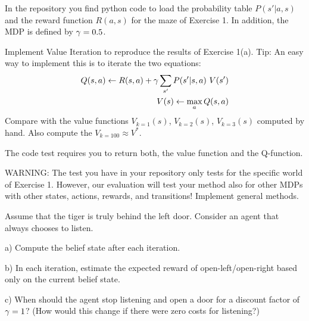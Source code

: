 

In the repository you find python code to load the probability table
$P(s'|a,s)$ and the reward function $R(a,s)$ for the maze of Exercise
1. In addition, the MDP is defined by $\gamma=0.5$.

Implement Value Iteration to reproduce the results of Exercise
1(a). Tip: An easy way to implement this is to iterate the two
equations:
\begin{align}
Q(s,a) \gets R(s,a) + \gamma \sum_{s'} P(s'|s,a)~ V(s') \\
V(s) \gets \max_a Q(s,a)
\end{align}
Compare with the value functions $V_{k=1}(s)$,
$V_{k=2}(s)$, $V_{k=3}(s)$ computed by hand. Also compute the
$V_{k=100} \approx V^*$.

The code test requires you to return both, the value function and the Q-function.

WARNING: The test you have in your repository only tests for the specific world of Exercise 1. However, our evaluation will test your method also for other MDPs with other states, actions, rewards, and transitions! Implement general methods.



Assume that the tiger is truly behind the left door. Consider an agent that always chooses to listen.

a) Compute the belief state after each iteration.

b) In each iteration, estimate the expected reward of
open-left/open-right based only on the current belief state.

c) When should the agent stop listening and open a door for a discount
factor of $\gamma=1$? (How would this change if there were zero costs for listening?)







\exerfoot
